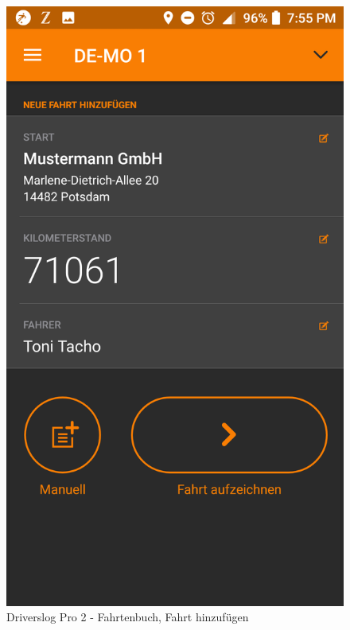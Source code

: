 \begin{figure}[H]
\begin{minipage}[b]{.4\linewidth}
        \includegraphics[scale=0.14]{img/pro2}
        \caption{\label{img:img/pro2}Driverslog Pro 2 - Fahrtenbuch, Fahrt hinzufügen}
    \end{minipage}
\end{figure}

